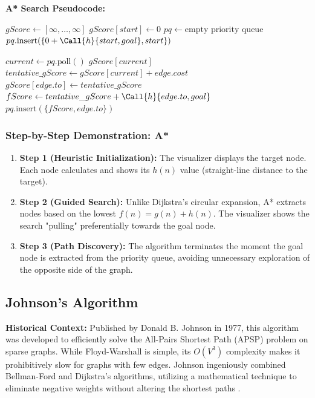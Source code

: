 \textbf{A* Search Pseudocode:}
\begin{algorithm}[H]
\caption{A* Search Algorithm}
\begin{algorithmic}[1]
    \State $gScore \gets [\infty, \dots, \infty]$
    \State $gScore[start] \gets 0$
    \State $pq \gets \text{empty priority queue}$
    \State $pq.\text{insert}(\{0 + \Call{h}{start, goal}, start\})$ 
    
        \State $current \gets pq.\text{poll}()$
            \State \Return $gScore[current]$
        \EndIf
            \State $tentative\_gScore \gets gScore[current] + edge.cost$
                \State $gScore[edge.to] \gets tentative\_gScore$
                \State $fScore \gets tentative\_gScore + \Call{h}{edge.to, goal}$
                \State $pq.\text{insert}(\{fScore, edge.to\})$
            \EndIf
        \EndFor
    \EndWhile
\EndFunction
\end{algorithmic}
\end{algorithm}

\subsubsection{Step-by-Step Demonstration: A*}
\begin{enumerate}
    \item \textbf{Step 1 (Heuristic Initialization):} The visualizer displays the target node. Each node calculates and shows its $h(n)$ value (straight-line distance to the target).
    \item \textbf{Step 2 (Guided Search):} Unlike Dijkstra's circular expansion, A* extracts nodes based on the lowest $f(n) = g(n) + h(n)$. The visualizer shows the search "pulling" preferentially towards the goal node.
    \item \textbf{Step 3 (Path Discovery):} The algorithm terminates the moment the goal node is extracted from the priority queue, avoiding unnecessary exploration of the opposite side of the graph.
\end{enumerate}
\subsection{Johnson's Algorithm}
\textbf{Historical Context:} Published by Donald B. Johnson in 1977, this algorithm was developed to efficiently solve the All-Pairs Shortest Path (APSP) problem on sparse graphs. While Floyd-Warshall is simple, its $O(V^3)$ complexity makes it prohibitively slow for graphs with few edges. Johnson ingeniously combined Bellman-Ford and Dijkstra's algorithms, utilizing a mathematical technique to eliminate negative weights without altering the shortest paths \cite{johnson1977efficient}.


